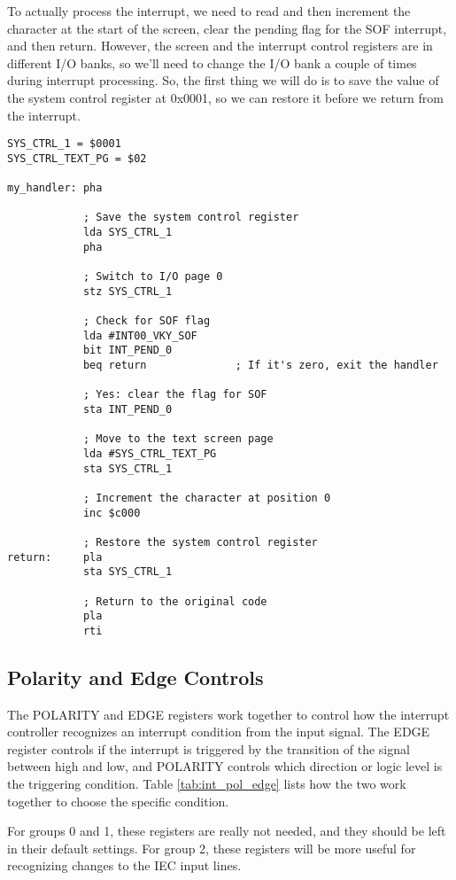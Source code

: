 To actually process the interrupt, we need to read and then increment the character at the start of the screen, clear the pending flag for the SOF interrupt, and then return. However, the screen and the interrupt control registers are in different I/O banks, so we'll need to change the I/O bank a couple of times during interrupt processing. So, the first thing we will do is to save the value of the system control register at 0x0001, so we can restore it before we return from the interrupt.

\begin{verbatim}
SYS_CTRL_1 = $0001
SYS_CTRL_TEXT_PG = $02

my_handler: pha

            ; Save the system control register
            lda SYS_CTRL_1
            pha

            ; Switch to I/O page 0
            stz SYS_CTRL_1

            ; Check for SOF flag
            lda #INT00_VKY_SOF
            bit INT_PEND_0
            beq return              ; If it's zero, exit the handler

            ; Yes: clear the flag for SOF
            sta INT_PEND_0

            ; Move to the text screen page
            lda #SYS_CTRL_TEXT_PG
            sta SYS_CTRL_1

            ; Increment the character at position 0
            inc $c000

            ; Restore the system control register
return:     pla
            sta SYS_CTRL_1

            ; Return to the original code
            pla
            rti
\end{verbatim}

\subsection*{Polarity and Edge Controls}
The POLARITY and EDGE registers work together to control how the interrupt controller recognizes an interrupt condition from the input signal. The EDGE register controls if the interrupt is triggered by the transition of the signal between high and low, and POLARITY controls which direction or logic level is the triggering condition. Table \ref{tab:int_pol_edge} lists how the two work together to choose the specific condition.

For groups 0 and 1, these registers are really not needed, and they should be left in their default settings. For group 2, these registers will be more useful for recognizing changes to the IEC input lines.


